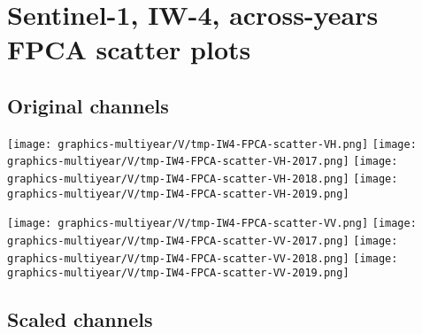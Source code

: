 
\section{Sentinel-1, IW-4, across-years FPCA scatter plots}
\setcounter{theorem}{0}

\renewcommand{\theenumi}{\roman{enumi}}
\renewcommand{\labelenumi}{\textnormal{(\theenumi)}$\;\;$}


\subsection{Original channels}
\label{FPCA-scatter-original}

\begin{center}
\begin{minipage}{7.0in}
\texttt{[image: graphics-multiyear/V/tmp-IW4-FPCA-scatter-VH.png]}
\quad
\texttt{[image: graphics-multiyear/V/tmp-IW4-FPCA-scatter-VH-2017.png]}
\vskip 1.0cm
\texttt{[image: graphics-multiyear/V/tmp-IW4-FPCA-scatter-VH-2018.png]}
\quad
\texttt{[image: graphics-multiyear/V/tmp-IW4-FPCA-scatter-VH-2019.png]}
\end{minipage}
\end{center}


\clearpage
\begin{center}
\begin{minipage}{7.0in}
\texttt{[image: graphics-multiyear/V/tmp-IW4-FPCA-scatter-VV.png]}
\quad
\texttt{[image: graphics-multiyear/V/tmp-IW4-FPCA-scatter-VV-2017.png]}
\vskip 1.0cm
\texttt{[image: graphics-multiyear/V/tmp-IW4-FPCA-scatter-VV-2018.png]}
\quad
\texttt{[image: graphics-multiyear/V/tmp-IW4-FPCA-scatter-VV-2019.png]}
\end{minipage}
\end{center}


\clearpage

\subsection{Scaled channels}
\label{FPCA-scatter-scaled}

